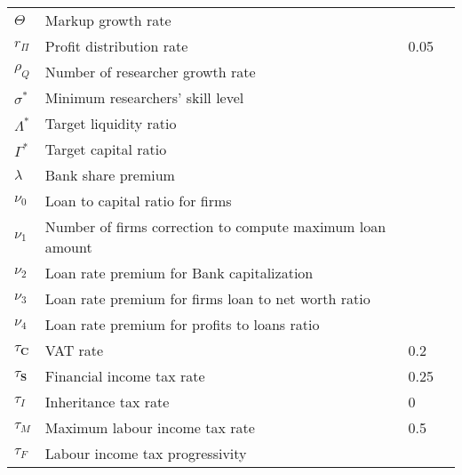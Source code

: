 \documentclass[a4paper, headings=standardclasses]{scrartcl}
\begin{document}
\begin{tabularx}{\linewidth}{lXll}
	$\Theta$                     & Markup growth rate                                           &        &        \\
	$r_\Pi$                      & Profit distribution rate                                     & 0.05   &        \\
	$\rho_Q$                     & Number of researcher growth rate                             &        &        \\
	$\sigma^*$                   & Minimum researchers' skill level                             &        &        \\
	$\Lambda^*$                  & Target liquidity ratio                                       &        &        \\
	$\Gamma^*$                   & Target capital ratio                                         &        &        \\
	$\lambda$                    & Bank share premium                                           &        &        \\
	$\nu_0$                      & Loan to capital ratio for firms                              &        &        \\
	$\nu_1$                      & Number of firms correction to compute maximum loan amount    &        &        \\
	$\nu_2$                      & Loan rate premium for Bank capitalization                    &        &        \\
	$\nu_3$                      & Loan rate premium for firms loan to net worth ratio          &        &        \\
	$\nu_4$                      & Loan rate premium for profits to loans ratio                 &        &        \\
	$\tau_\mathbf{C}$            & VAT rate                                                     & 0.2    &        \\
	$\tau_\mathbf{S}$            & Financial income tax rate                                    & 0.25   &        \\
	$\tau_I$                     & Inheritance tax rate                                         & 0      &        \\
	$\tau_M$                     & Maximum labour income tax rate                               & 0.5    &        \\
	$\tau_F$                     & Labour income tax progressivity                              &        &        \\

\end{tabularx}
\end{document}

